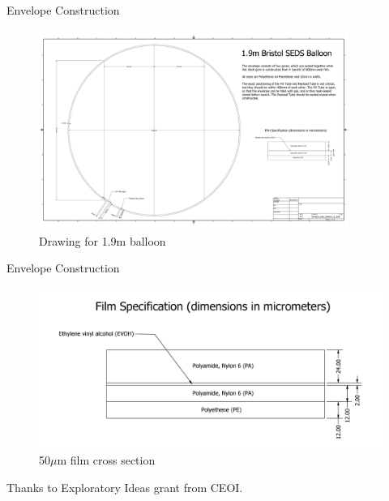 \documentclass{beamer}
\begin{document}
\begin{frame}{Envelope Construction}

  \begin{figure}[!ht]
    \centering
    \includegraphics[width=0.9\textwidth]{bristol_seds_balloon_1_9m.png}
    \caption{Drawing for 1.9m balloon}
  \end{figure}

\end{frame}

\begin{frame}{Envelope Construction}

  \begin{figure}[!ht]
    \centering
    \includegraphics[width=1\textwidth]{bristol_seds_balloon_1_9m_film.png}
    \caption{50$\mu$m film cross section}
  \end{figure}

  Thanks to Exploratory Ideas grant from CEOI.

\end{frame}
\end{document}
